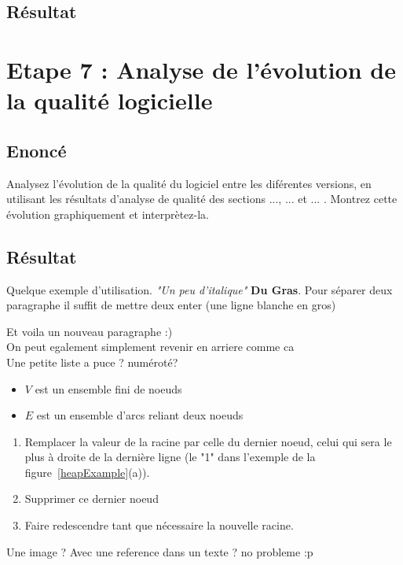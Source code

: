 \documentclass[12pt,a4paper,final]{article}
\begin{document}
\subsection{Résultat}



\section{Etape 7 : Analyse de l'évolution de la qualité logicielle}\label{sec:etape7}
\subsection{Enoncé} 
Analysez l'évolution de la qualité du logiciel entre les diférentes versions, en utilisant les résultats d'analyse de qualité des sections ..., ... et ... . Montrez cette évolution graphiquement et interprètez-la.
\subsection{Résultat}







Quelque exemple d'utilisation. \textit{"Un peu d'italique"} \textbf{Du Gras}. Pour séparer deux paragraphe il suffit de mettre deux enter (une ligne blanche en gros)

Et voila un nouveau paragraphe :)\\
On peut egalement simplement revenir en arriere comme ca \\

Une petite liste a puce ? numéroté?

\begin{itemize}
\item $V$ est un ensemble fini de noeuds
\item $E$ est un ensemble d'arcs reliant deux noeuds
\end{itemize}

\begin{enumerate}
\item Remplacer la valeur de la racine par celle du dernier noeud, celui qui sera le plus à droite de la dernière ligne (le "1" dans l'exemple de la figure~\ref{heapExample}(a)).
\item Supprimer ce dernier noeud
\item Faire redescendre tant que nécessaire la nouvelle racine.
\end{enumerate}
Une image ? Avec une reference dans un texte ? no probleme :p
\end{document}
